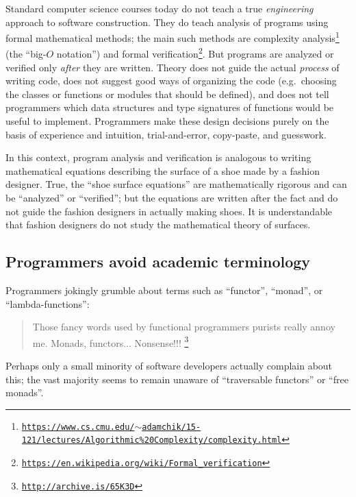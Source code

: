 Standard computer science courses today do not teach a true \emph{engineering}
approach to software construction. They do teach analysis of programs
using formal mathematical methods; the main such methods are complexity
analysis\footnote{\texttt{\href{https://www.cs.cmu.edu/~adamchik/15-121/lectures/Algorithmic\%20Complexity/complexity.html}{https://www.cs.cmu.edu/$\sim$adamchik/15-121/lectures/Algorithmic\%20Complexity/complexity.html}}}
(the \textsf{``}big-$O$ notation\textsf{''}) and formal verification\footnote{\texttt{\href{https://en.wikipedia.org/wiki/Formal_verification}{https://en.wikipedia.org/wiki/Formal\_verification}}}.
But programs are analyzed or verified only \emph{after} they are written.
Theory does not guide the actual \emph{process} of writing code, does
not suggest good ways of organizing the code (e.g.~choosing the classes
or functions or modules that should be defined), and does not tell
programmers which data structures and type signatures of functions
would be useful to implement. Programmers make these design decisions
purely on the basis of experience and intuition, trial-and-error,
copy-paste, and guesswork. 

In this context, program analysis and verification is analogous to
writing mathematical equations describing the surface of a shoe made
by a fashion designer. True, the \textsf{``}shoe surface equations\textsf{''} are
mathematically rigorous and can be \textsf{``}analyzed\textsf{''} or \textsf{``}verified\textsf{''};
but the equations are written after the fact and do not guide the
fashion designers in actually making shoes. It is understandable that
fashion designers do not study the mathematical theory of surfaces.

\subsection{Programmers avoid academic terminology }

Programmers jokingly grumble about terms such as \textsf{``}functor\textsf{''}, \textsf{``}monad\textsf{''},
or \textsf{``}lambda-functions\textsf{''}:
\begin{quote}
{\small{}Those fancy words used by functional programmers purists
really annoy me. Monads, functors... Nonsense!!! }\footnote{\texttt{\href{http://archive.is/65K3D}{http://archive.is/65K3D}}}
\end{quote}
Perhaps only a small minority of software developers actually complain
about this; the vast majority seems to remain unaware of \textsf{``}traversable
functors\textsf{''} or \textsf{``}free monads\textsf{''}.

